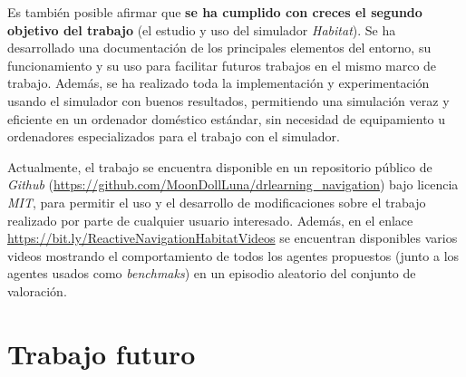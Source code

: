 Es también posible afirmar que \textbf{se ha cumplido con creces el segundo objetivo del trabajo} (el estudio y uso del simulador \textit{Habitat}). Se ha desarrollado una documentación de los principales elementos del entorno, su funcionamiento y su uso para facilitar futuros trabajos en el mismo marco de trabajo. Además, se ha realizado toda la implementación y experimentación usando el simulador con buenos resultados, permitiendo una simulación veraz y eficiente en un ordenador doméstico estándar, sin necesidad de equipamiento u ordenadores especializados para el trabajo con el simulador.

Actualmente, el trabajo se encuentra disponible en un repositorio público de \textit{Github} (\url{https://github.com/MoonDollLuna/drlearning_navigation}) bajo licencia \textit{MIT}, para permitir el uso y el desarrollo de modificaciones sobre el trabajo realizado por parte de cualquier usuario interesado. Además, en el enlace \url{https://bit.ly/ReactiveNavigationHabitatVideos} se encuentran disponibles varios videos mostrando el comportamiento de todos los agentes propuestos (junto a los agentes usados como \textit{benchmaks}) en un episodio aleatorio del conjunto de valoración.

\section{Trabajo futuro}

